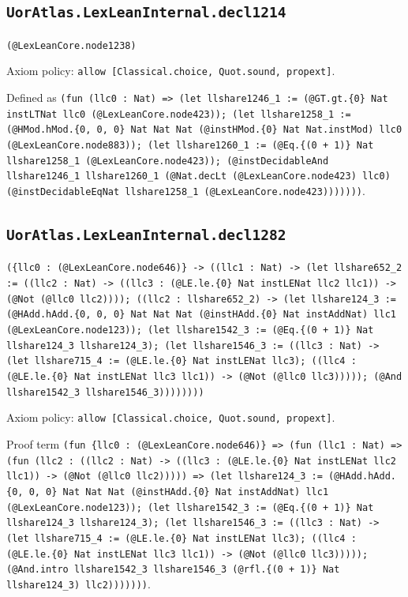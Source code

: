 \documentclass[11pt]{article}
\begin{document}
\subsection*{\texttt{UorAtlas.LexLeanInternal.decl1214}}
\noindent\texttt{(@LexLeanCore.node1238)}\par
\noindent Axiom policy: \texttt{allow [Classical.choice, Quot.sound, propext]}.\par
\noindent Defined as \texttt{(fun (llc0 : Nat) => (let llshare1246\_1 := (@GT.gt.\{0\} Nat instLTNat llc0 (@LexLeanCore.node423)); (let llshare1258\_1 := (@HMod.hMod.\{0, 0, 0\} Nat Nat Nat (@instHMod.\{0\} Nat Nat.instMod) llc0 (@LexLeanCore.node883)); (let llshare1260\_1 := (@Eq.\{(0 + 1)\} Nat llshare1258\_1 (@LexLeanCore.node423)); (@instDecidableAnd llshare1246\_1 llshare1260\_1 (@Nat.decLt (@LexLeanCore.node423) llc0) (@instDecidableEqNat llshare1258\_1 (@LexLeanCore.node423)))))))}.\par
\subsection*{\texttt{UorAtlas.LexLeanInternal.decl1282}}
\noindent\texttt{(\{llc0 : (@LexLeanCore.node646)\} -> ((llc1 : Nat) -> (let llshare652\_2 := ((llc2 : Nat) -> ((llc3 : (@LE.le.\{0\} Nat instLENat llc2 llc1)) -> (@Not (@llc0 llc2)))); ((llc2 : llshare652\_2) -> (let llshare124\_3 := (@HAdd.hAdd.\{0, 0, 0\} Nat Nat Nat (@instHAdd.\{0\} Nat instAddNat) llc1 (@LexLeanCore.node123)); (let llshare1542\_3 := (@Eq.\{(0 + 1)\} Nat llshare124\_3 llshare124\_3); (let llshare1546\_3 := ((llc3 : Nat) -> (let llshare715\_4 := (@LE.le.\{0\} Nat instLENat llc3); ((llc4 : (@LE.le.\{0\} Nat instLENat llc3 llc1)) -> (@Not (@llc0 llc3))))); (@And llshare1542\_3 llshare1546\_3))))))))}\par
\noindent Axiom policy: \texttt{allow [Classical.choice, Quot.sound, propext]}.\par
\noindent Proof term \texttt{(fun \{llc0 : (@LexLeanCore.node646)\} => (fun (llc1 : Nat) => (fun (llc2 : ((llc2 : Nat) -> ((llc3 : (@LE.le.\{0\} Nat instLENat llc2 llc1)) -> (@Not (@llc0 llc2))))) => (let llshare124\_3 := (@HAdd.hAdd.\{0, 0, 0\} Nat Nat Nat (@instHAdd.\{0\} Nat instAddNat) llc1 (@LexLeanCore.node123)); (let llshare1542\_3 := (@Eq.\{(0 + 1)\} Nat llshare124\_3 llshare124\_3); (let llshare1546\_3 := ((llc3 : Nat) -> (let llshare715\_4 := (@LE.le.\{0\} Nat instLENat llc3); ((llc4 : (@LE.le.\{0\} Nat instLENat llc3 llc1)) -> (@Not (@llc0 llc3))))); (@And.intro llshare1542\_3 llshare1546\_3 (@rfl.\{(0 + 1)\} Nat llshare124\_3) llc2)))))))}.\par
\end{document}
